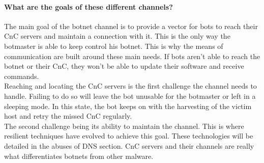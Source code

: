 \paragraph{What are the goals of these different channels?}
The main goal of the botnet channel is to provide a vector for bots to reach their CnC servers and maintain a connection with it. This is the only way the botmaster is able to keep control his botnet. This is why the means of communication are built around these main needs. If bots aren't able to reach the botnet or their CnC, they won't be able to update their software and receive commands.\\ 
Reaching and locating the CnC servers is the first challenge the channel needs to handle. Failing to do so will leave the bot unusable for the botmaster or left in a sleeping mode. In this state, the bot keeps on with the harvesting of the victim host and retry the missed CnC regularly. \\
The second challenge being its ability to maintain the channel. This is where resilient techniques have evolved to achieve this goal. These technologies will be detailed in the abuses of DNS section. CnC servers and their channels are really what differentiates botnets from other malware. 
	
